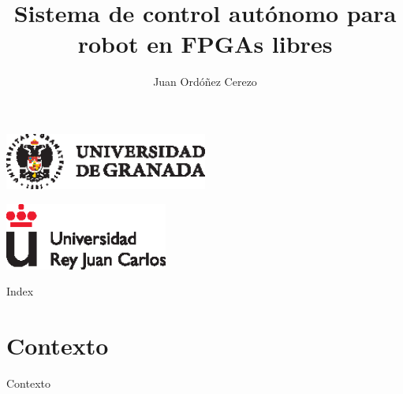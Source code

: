 \documentclass{beamer}
\title{Sistema de control autónomo para robot en FPGAs libres}
\subtitle{}
\author{Juan Ordóñez Cerezo\inst{1}}
\institute[Universidad de Granada] %
{
  \inst{1}%
  Universidad de Granada
}
\date{}
\begin{document}
\begin{frame}
  \begin{center}
  \includegraphics [width =0.5\textwidth ]{logo_ugr}
  \end{center}
    \begin{center}
	\includegraphics [width =0.4\textwidth ]{logo_rey}
	\end{center}
  \titlepage
\end{frame}

\begin{frame}{Index}
  \tableofcontents
\end{frame}

\section{Contexto}

\begin{frame}{Contexto}
	
\end{frame}
\end{document}
